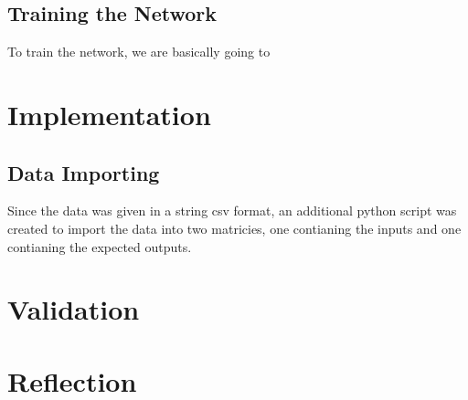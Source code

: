 \documentclass[10pt]{article}
\begin{document}
\subsection{Training the Network}
To train the network, we are basically going to 

\section{Implementation}
\subsection{Data Importing}
Since the data was given in a string csv format, an additional python script was created to import the data into two matricies, one contianing the inputs and one contianing the expected outputs.
\section{Validation}
\section{Reflection}
\end{document}
